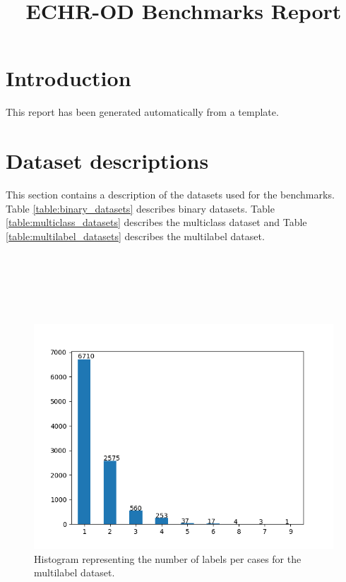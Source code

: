 \documentclass{article}
\begin{document}
\title{ECHR-OD Benchmarks Report}


\maketitle

\tableofcontents


\section*{Introduction}

This report has been generated automatically from a template.

\section{Dataset descriptions}

This section contains a description of the datasets used for the benchmarks.
Table \ref{table:binary_datasets} describes binary datasets. Table \ref{table:multiclass_datasets} describes the multiclass dataset and Table \ref{table:multilabel_datasets} describes the multilabel dataset.

~\\
\newpage

~\\
\newpage

~\\
\newpage



\begin{figure}
    \centering
    \includegraphics[scale=0.6]{data/analysis/labels_per_cases.png}
    \caption{Histogram representing the number of labels per cases for the multilabel dataset.}
\end{figure}
\end{document}

